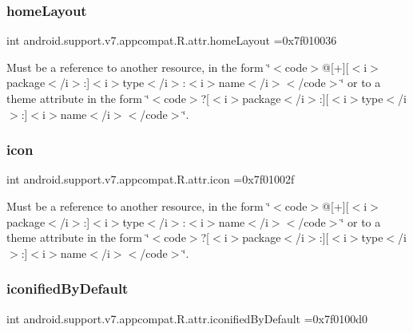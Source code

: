 \subsubsection{\texorpdfstring{home\+Layout}{homeLayout}}
{\footnotesize\ttfamily int android.\+support.\+v7.\+appcompat.\+R.\+attr.\+home\+Layout =0x7f010036\hspace{0.3cm}{\ttfamily [static]}}

Must be a reference to another resource, in the form \char`\"{}$<$code$>$@\mbox{[}+\mbox{]}\mbox{[}$<$i$>$package$<$/i$>$\+:\mbox{]}$<$i$>$type$<$/i$>$\+:$<$i$>$name$<$/i$>$$<$/code$>$\char`\"{} or to a theme attribute in the form \char`\"{}$<$code$>$?\mbox{[}$<$i$>$package$<$/i$>$\+:\mbox{]}\mbox{[}$<$i$>$type$<$/i$>$\+:\mbox{]}$<$i$>$name$<$/i$>$$<$/code$>$\char`\"{}. \mbox{\label{classandroid_1_1support_1_1v7_1_1appcompat_1_1R_1_1attr_a1495dfa420da91a99a7d7c104558f64b}} 
\subsubsection{\texorpdfstring{icon}{icon}}
{\footnotesize\ttfamily int android.\+support.\+v7.\+appcompat.\+R.\+attr.\+icon =0x7f01002f\hspace{0.3cm}{\ttfamily [static]}}

Must be a reference to another resource, in the form \char`\"{}$<$code$>$@\mbox{[}+\mbox{]}\mbox{[}$<$i$>$package$<$/i$>$\+:\mbox{]}$<$i$>$type$<$/i$>$\+:$<$i$>$name$<$/i$>$$<$/code$>$\char`\"{} or to a theme attribute in the form \char`\"{}$<$code$>$?\mbox{[}$<$i$>$package$<$/i$>$\+:\mbox{]}\mbox{[}$<$i$>$type$<$/i$>$\+:\mbox{]}$<$i$>$name$<$/i$>$$<$/code$>$\char`\"{}. \mbox{\label{classandroid_1_1support_1_1v7_1_1appcompat_1_1R_1_1attr_a2f5e13cb01c52d709d8f0ca2895285e9}} 
\subsubsection{\texorpdfstring{iconified\+By\+Default}{iconifiedByDefault}}
{\footnotesize\ttfamily int android.\+support.\+v7.\+appcompat.\+R.\+attr.\+iconified\+By\+Default =0x7f0100d0\hspace{0.3cm}{\ttfamily [static]}}

